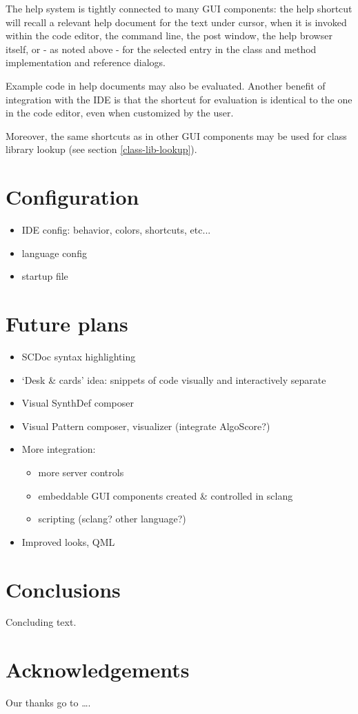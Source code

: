 \documentclass[11pt,a4paper]{article}
\begin{document}
The help system is tightly connected to many GUI components: the help shortcut will recall a relevant help document
for the text under cursor, when it is invoked within the code editor, the command line, the post window, the help
browser itself, or - as noted above - for the selected entry in the class and method implementation and reference
dialogs.

Example code in help documents may also be evaluated. Another benefit of integration with the IDE is that the shortcut
for evaluation is identical to the one in the code editor, even when customized by the user.

Moreover, the same shortcuts as in other GUI components may be used for class library lookup (see section
\ref{class-lib-lookup}).

\section{Configuration}

\begin{itemize}
 \item IDE config: behavior, colors, shortcuts, etc...
 \item language config
 \item startup file
\end{itemize}


\section{Future plans}

\begin{itemize}
 \item SCDoc syntax highlighting
 \item `Desk \& cards' idea: snippets of code visually and interactively separate
 \item Visual SynthDef composer
 \item Visual Pattern composer, visualizer (integrate AlgoScore?)
 \item More integration:
 \begin{itemize}
    \item more server controls
    \item  embeddable GUI components created \& controlled in sclang
    \item  scripting (sclang? other language?)
 \end{itemize}
 \item Improved looks, QML
\end{itemize}

\section{Conclusions}

Concluding text.

\section{Acknowledgements}

Our thanks go to \ldots .



\end{document}
